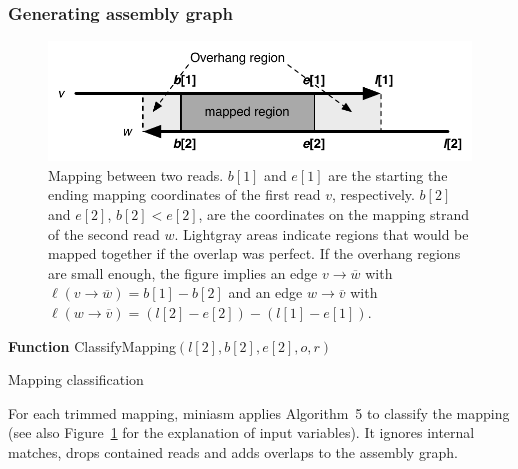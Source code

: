 \documentclass{bioinfo}
\begin{document}
\begin{methods}
\subsubsection{Generating assembly graph}

\begin{figure}[tb]
\centering
\includegraphics[width=.45\textwidth]{overhang}
\caption{Mapping between two reads. $b[1]$ and $e[1]$ are the starting the
ending mapping coordinates of the first read $v$, respectively. $b[2]$ and
$e[2]$, $b[2]<e[2]$, are the coordinates on the mapping strand of the second
read $w$. Lightgray areas indicate regions that would be mapped together if the
overlap was perfect. If the overhang regions are small enough, the figure
implies an edge $v\to\overline{w}$ with $\ell(v\to\overline{w})=b[1]-b[2]$ and
an edge $w\to\overline{v}$ with
$\ell(w\to\overline{v})=(l[2]-e[2])-(l[1]-e[1])$.}\label{fig:overhang}
\end{figure}

\begin{algorithm}[bt]
\DontPrintSemicolon
\footnotesize
{}
\BlankLine
\textbf{Function} {\sc ClassifyMapping}$(l[2], b[2], e[2], o, r)$
\caption{Mapping classification}
\end{algorithm}

For each trimmed mapping, miniasm applies Algorithm~5 to classify the mapping
(see also Figure~\ref{fig:overhang} for the explanation of input variables).
It ignores internal matches, drops contained reads and adds overlaps to the
assembly graph.



\end{methods}
\end{document}
